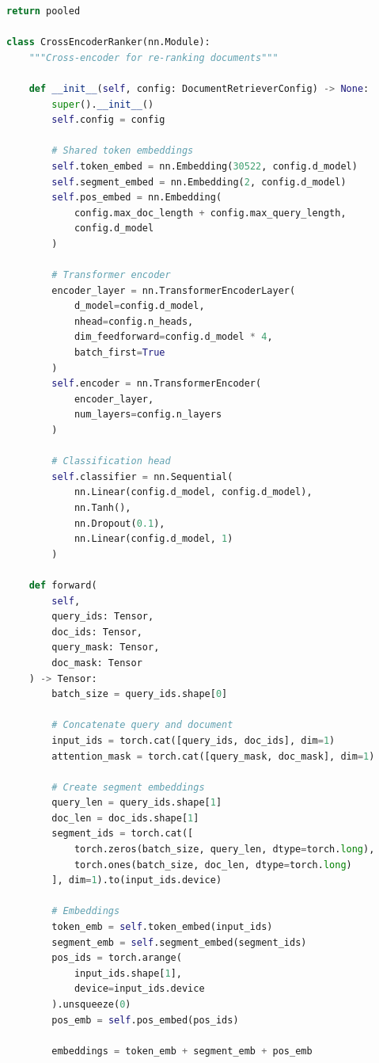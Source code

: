 \documentclass[11pt]{article}
\begin{document}
\begin{lstlisting}[language=Python, caption=Document Retrieval System]
        return pooled

class CrossEncoderRanker(nn.Module):
    """Cross-encoder for re-ranking documents"""
    
    def __init__(self, config: DocumentRetrieverConfig) -> None:
        super().__init__()
        self.config = config
        
        # Shared token embeddings
        self.token_embed = nn.Embedding(30522, config.d_model)
        self.segment_embed = nn.Embedding(2, config.d_model)
        self.pos_embed = nn.Embedding(
            config.max_doc_length + config.max_query_length,
            config.d_model
        )
        
        # Transformer encoder
        encoder_layer = nn.TransformerEncoderLayer(
            d_model=config.d_model,
            nhead=config.n_heads,
            dim_feedforward=config.d_model * 4,
            batch_first=True
        )
        self.encoder = nn.TransformerEncoder(
            encoder_layer,
            num_layers=config.n_layers
        )
        
        # Classification head
        self.classifier = nn.Sequential(
            nn.Linear(config.d_model, config.d_model),
            nn.Tanh(),
            nn.Dropout(0.1),
            nn.Linear(config.d_model, 1)
        )
        
    def forward(
        self,
        query_ids: Tensor,
        doc_ids: Tensor,
        query_mask: Tensor,
        doc_mask: Tensor
    ) -> Tensor:
        batch_size = query_ids.shape[0]
        
        # Concatenate query and document
        input_ids = torch.cat([query_ids, doc_ids], dim=1)
        attention_mask = torch.cat([query_mask, doc_mask], dim=1)
        
        # Create segment embeddings
        query_len = query_ids.shape[1]
        doc_len = doc_ids.shape[1]
        segment_ids = torch.cat([
            torch.zeros(batch_size, query_len, dtype=torch.long),
            torch.ones(batch_size, doc_len, dtype=torch.long)
        ], dim=1).to(input_ids.device)
        
        # Embeddings
        token_emb = self.token_embed(input_ids)
        segment_emb = self.segment_embed(segment_ids)
        pos_ids = torch.arange(
            input_ids.shape[1],
            device=input_ids.device
        ).unsqueeze(0)
        pos_emb = self.pos_embed(pos_ids)
        
        embeddings = token_emb + segment_emb + pos_emb
        

\end{lstlisting}
\end{document}
